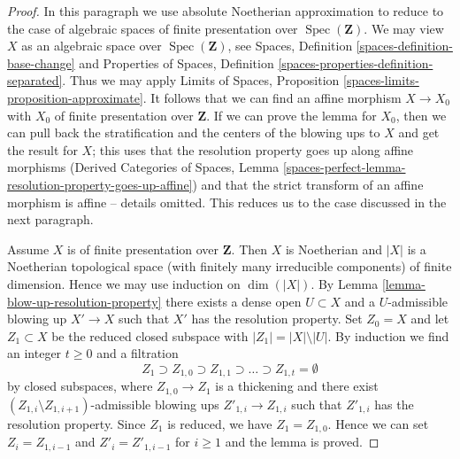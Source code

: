 \documentclass[10pt,a4paper]{amsart}
\theoremstyle{plain}
\theoremstyle{definition}
\theoremstyle{remark}
\numberwithin{equation}{subsection}
\def\Spec{\mathop{\mathrm{Spec}}}
\begin{document}
\begin{proof}
In this paragraph we use absolute Noetherian approximation to reduce to the
case of algebraic spaces of finite presentation over $\Spec(\mathbf{Z})$.
We may view $X$ as an algebraic space over $\Spec(\mathbf{Z})$, see
Spaces, Definition \ref{spaces-definition-base-change} and
Properties of Spaces, Definition \ref{spaces-properties-definition-separated}.
Thus we may apply Limits of Spaces, Proposition
\ref{spaces-limits-proposition-approximate}.
It follows that we can find an affine morphism $X \to X_0$
with $X_0$ of finite presentation over $\mathbf{Z}$.
If we can prove the lemma for $X_0$, then we can pull back
the stratification and the centers of the blowing ups to $X$
and get the result for $X$; this uses that the resolution property
goes up along affine morphisms (Derived Categories of Spaces,
Lemma \ref{spaces-perfect-lemma-resolution-property-goes-up-affine}) and
that the strict transform of an affine morphism is affine -- details omitted.
This reduces us to the case discussed in the next paragraph.

\medskip\noindent
Assume $X$ is of finite presentation over $\mathbf{Z}$.
Then $X$ is Noetherian and $|X|$ is a Noetherian topological
space (with finitely many irreducible components) of finite dimension.
Hence we may use induction on $\dim(|X|)$.
By Lemma \ref{lemma-blow-up-resolution-property}
there exists a dense open $U \subset X$ and a $U$-admissible
blowing up $X' \to X$ such that $X'$ has the resolution property.
Set $Z_0 = X$ and let $Z_1 \subset X$ be the reduced closed subspace
with $|Z_1| = |X| \setminus |U|$.
By induction we find an integer $t \geq 0$ and a filtration
$$
Z_1 \supset Z_{1, 0} \supset Z_{1, 1} \supset \ldots
\supset Z_{1, t} = \emptyset
$$
by closed subspaces, where $Z_{1, 0} \to Z_1$ is a thickening
and there exist $(Z_{1, i} \setminus Z_{1, i + 1})$-admissible
blowing ups $Z'_{1, i} \to Z_{1, i}$ such that $Z'_{1, i}$
has the resolution property. Since $Z_1$ is reduced, we have $Z_1 = Z_{1, 0}$.
Hence we can set $Z_i = Z_{1, i - 1}$ and $Z'_i = Z'_{1, i - 1}$
for $i \geq 1$ and the lemma is proved.
\end{proof}
\end{document}
